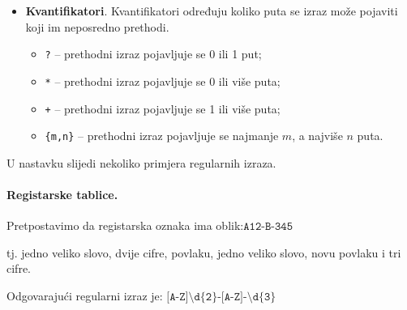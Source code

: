 \begin{itemize}
\begin{itemize}
		\item \texttt{\textbackslash w} -- odgovara slovu, cifri ili znaku ``\texttt{\_}'';
		
		\item \texttt{\textbackslash s} -- odgovara praznom znaku (razmak, tabulator, novi red);
		
		\item \texttt{\textbackslash n} -- odgovara znaku novog reda;
		
		\item \texttt{\textbackslash t} -- odgovara tabulatoru;
		
		\item \texttt{\textbackslash b} -- odgovara granici riječi.
		
	\end{itemize}
	
	\item \textbf{Kvantifikatori}. Kvantifikatori određuju koliko puta se izraz  može pojaviti  koji im neposredno prethodi.
	
	\begin{itemize}
		
		\item \texttt{?} -- prethodni izraz pojavljuje se 0 ili 1 put;
		
		\item \texttt{*} -- prethodni izraz pojavljuje se 0 ili više puta;
		
		\item \texttt{+} -- prethodni izraz pojavljuje se 1 ili više puta;
		
		\item \texttt{\{m,n\}} -- prethodni izraz pojavljuje se najmanje $m$, a najviše $n$ puta.
		
	\end{itemize}
	
\end{itemize}

U nastavku slijedi nekoliko primjera regularnih izraza.
 

\paragraph{Registarske tablice.}

Pretpostavimo da registarska oznaka ima oblik:$
\texttt{A12-B-345}$

tj. jedno veliko slovo, dvije cifre, povlaku, jedno veliko slovo, novu povlaku i tri cifre.

Odgovarajući regularni izraz je: $
\texttt{[A-Z]\textbackslash d\{2\}-[A-Z]-\textbackslash d\{3\}}$

